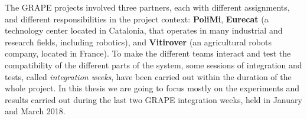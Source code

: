 The \ac{GRAPE} projects involved three partners, each with different assignments, and different responsibilities in the project context: \textbf{PoliMi}, \textbf{Eurecat} (a technology center located in Catalonia, that operates in many industrial and research fields, including robotics), and \textbf{Vitirover} (an agricultural robots company, located in France).
To make the different teams interact and test the compatibility of the different parts of the system, some sessions of integration and tests, called \textit{integration weeks}, have been carried out within the duration of the whole project. In this thesis we are going to focus mostly on the experiments and results carried out during the last two \ac{GRAPE} integration weeks, held in January and March 2018.

\begin{figure}
	\begin{minipage}[]{.5\textwidth}
	\end{minipage}
	\begin{minipage}[]{.5\textwidth}
\end{minipage}
\end{figure}

